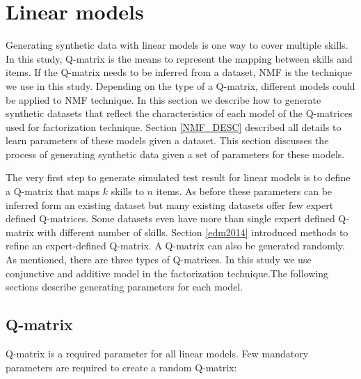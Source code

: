 \section{Linear models}
\label{LinearModelSynthetic}
Generating synthetic data with linear models is one way to cover multiple skills. In this study, Q-matrix is the means to represent the mapping between skills and items. If the Q-matrix needs to be inferred from a dataset, NMF is the technique we use in this study. Depending on the type of a Q-matrix, different models could be applied to NMF technique. In this section we describe how to generate synthetic datasets that reflect the characteristics of each model of the Q-matrices used for factorization technique. Section \ref{NMF_DESC} described all details to learn parameters of these models given a dataset. This section discusses the process of generating synthetic data given a set of parameters for these models.

The very first step to generate simulated test result for linear models is to define a Q-matrix that maps $k$ skills to $n$ items. As before these parameters can be inferred form an existing dataset but many existing datasets offer few expert defined Q-matrices. Some datasets even have more than single expert defined Q-matrix with different number of skills. Section \ref{edm2014} introduced methods to refine an expert-defined Q-matrix. A Q-matrix can also be generated randomly. As mentioned, there are three types of Q-matrices. In this study we use conjunctive and additive model in the factorization technique.The following sections describe generating parameters for each model.

\subsection{Q-matrix}
\label{Q-MatrixObtain}
Q-matrix is a required parameter for all linear models. Few mandatory parameters are required to create a random Q-matrix:

